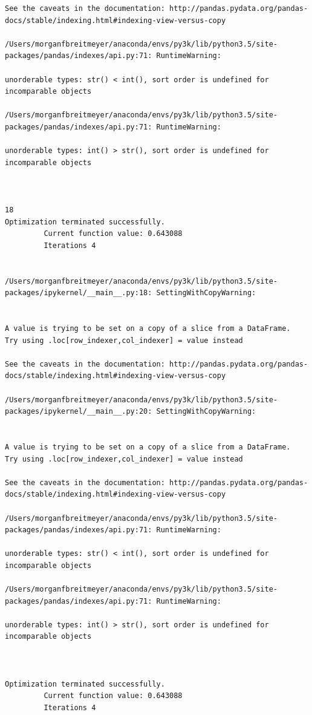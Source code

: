 \begin{lstlisting}
See the caveats in the documentation: http://pandas.pydata.org/pandas-docs/stable/indexing.html#indexing-view-versus-copy

/Users/morganfbreitmeyer/anaconda/envs/py3k/lib/python3.5/site-packages/pandas/indexes/api.py:71: RuntimeWarning:

unorderable types: str() < int(), sort order is undefined for incomparable objects

/Users/morganfbreitmeyer/anaconda/envs/py3k/lib/python3.5/site-packages/pandas/indexes/api.py:71: RuntimeWarning:

unorderable types: int() > str(), sort order is undefined for incomparable objects



18
Optimization terminated successfully.
         Current function value: 0.643088
         Iterations 4


/Users/morganfbreitmeyer/anaconda/envs/py3k/lib/python3.5/site-packages/ipykernel/__main__.py:18: SettingWithCopyWarning:


A value is trying to be set on a copy of a slice from a DataFrame.
Try using .loc[row_indexer,col_indexer] = value instead

See the caveats in the documentation: http://pandas.pydata.org/pandas-docs/stable/indexing.html#indexing-view-versus-copy

/Users/morganfbreitmeyer/anaconda/envs/py3k/lib/python3.5/site-packages/ipykernel/__main__.py:20: SettingWithCopyWarning:


A value is trying to be set on a copy of a slice from a DataFrame.
Try using .loc[row_indexer,col_indexer] = value instead

See the caveats in the documentation: http://pandas.pydata.org/pandas-docs/stable/indexing.html#indexing-view-versus-copy

/Users/morganfbreitmeyer/anaconda/envs/py3k/lib/python3.5/site-packages/pandas/indexes/api.py:71: RuntimeWarning:

unorderable types: str() < int(), sort order is undefined for incomparable objects

/Users/morganfbreitmeyer/anaconda/envs/py3k/lib/python3.5/site-packages/pandas/indexes/api.py:71: RuntimeWarning:

unorderable types: int() > str(), sort order is undefined for incomparable objects



Optimization terminated successfully.
         Current function value: 0.643088
         Iterations 4



\end{lstlisting}
